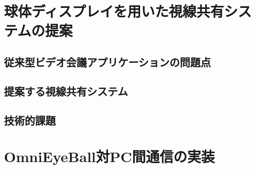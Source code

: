 \documentclass[a4j,11pt,oneside,openany,report,draft]{jsbook}
\begin{document}
\chapter{球体ディスプレイを用いた視線共有システムの提案}
\section{従来型ビデオ会議アプリケーションの問題点}
\section{提案する視線共有システム}
\section{技術的課題}

\chapter{OmniEyeBall対PC間通信の実装}
\end{document}
